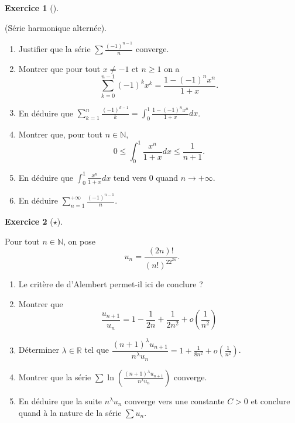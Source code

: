 \documentclass[
  french,
  letterpaper,
  DIV=11,
  numbers=noendperiod]{scrreprt}
\theoremstyle{plain}
\theoremstyle{definition}
\theoremstyle{plain}
\theoremstyle{plain}
\theoremstyle{definition}
\newtheorem{exercise}{Exercice}[chapter]
\theoremstyle{definition}
\theoremstyle{plain}
\theoremstyle{remark}
\begin{document}
\begin{exercise}[]\protect\hypertarget{exr-02-harmo-alt}{}\label{exr-02-harmo-alt}

(Série harmonique alternée).

\begin{enumerate}
\def\labelenumi{\arabic{enumi}.}
\item
  Justifier que la série \(\sum \frac{(-1)^{n-1}}{n}\) converge.
\item
  Montrer que pour tout \(x\neq -1\) et \(n\geqslant 1\) on a
  \[\sum_{k=0}^{n-1}(-1)^kx^k = \frac{1 - (-1)^nx^n}{1+x}.\]
\item
  En déduire que
  \(\displaystyle\sum_{k=1}^n \frac{(-1)^{k-1}}{k}=\int_0^1 \frac{1-(-1)^nx^n}{1+x}dx\).
\item
  Montrer que, pour tout \(n\in\mathbb{N}\),
  \[0\leqslant \int_0^1\frac{x^n}{1+x}dx\leqslant \frac{1}{n+1}.\]
\item
  En déduire que \(\displaystyle\int_0^1\frac{x^n}{1+x}dx\) tend vers
  \(0\) quand \(n\to +\infty\).
\item
  En déduire \(\sum_{n=1}^{+\infty}\frac{(-1)^{n-1}}{n}\).
\end{enumerate}

\end{exercise}

\begin{exercise}[\(\star\)]\protect\hypertarget{exr-02-serie-tel}{}\label{exr-02-serie-tel}

Pour tout \(n\in\mathbb{N}\), on pose
\[u_n = \frac{(2n)!}{(n!)^22^{2n}}.\]

\begin{enumerate}
\def\labelenumi{\arabic{enumi}.}
\item
  Le critère de d'Alembert permet-il ici de conclure ?
\item
  Montrer que
  \[\frac{u_{n+1}}{u_n} = 1 - \frac{1}{2n} + \frac{1}{2n^2} + o\left(\frac{1}{n^2}\right)\]
\item
  Déterminer \(\lambda\in\mathbb{R}\) tel que
  \(\dfrac{(n+1)^{\lambda}u_{n+1}}{n^\lambda u_{n}} = 1 + \frac{1}{8n^2} + o\left(\frac{1}{n^2}\right)\).
\item
  Montrer que la série
  \(\displaystyle \sum \ln\left(\frac{(n+1)^{\lambda}u_{n+1}}{n^\lambda u_{n}}\right)\)
  converge.
\item
  En déduire que la suite \(n^\lambda u_n\) converge vers une constante
  \(C>0\) et conclure quand à la nature de la série \(\sum u_n\).
\end{enumerate}

\end{exercise}
\end{document}
